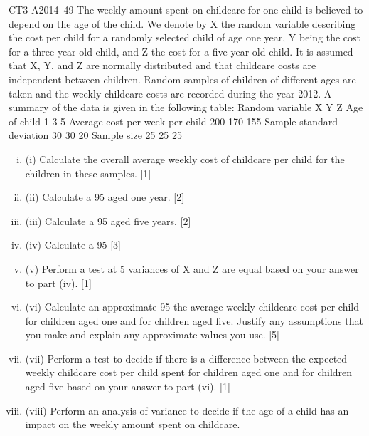 \documentclass[a4paper,12pt]{article}
\begin{document}
\begin{enumerate}
CT3 A2014–49
The weekly amount spent on childcare for one child is believed to depend on the age of the child. We denote by X the random variable describing the cost per child for a randomly selected child of age one year, Y being the cost for a three year old child, and Z the cost for a five year old child. It is assumed that X, Y, and Z are normally distributed and that childcare costs are independent between children. Random samples of children of different ages are taken and the weekly childcare costs are
recorded during the year 2012. A summary of the data is given in the following table:
Random variable
X
Y
Z
Age of child
1
3
5
Average cost per week per child 200 170 155
Sample standard deviation
30 30 20
Sample size
25 25 25

\begin{enumerate}[(i)]
\item (i)
Calculate the overall average weekly cost of childcare per child for the
children in these samples.
[1]
\item (ii) Calculate a 95%
aged one year.
[2]
\item (iii) Calculate a 95%
aged five years.
[2]
\item (iv) Calculate a 95%
[3]
\item (v) Perform a test at 5%
variances of X and Z are equal based on your answer to part (iv).
[1]
\item (vi) Calculate an approximate 95%
the average weekly childcare cost per child for children aged one and for
children aged five. Justify any assumptions that you make and explain any
approximate values you use.
[5]
\item (vii) Perform a test to decide if there is a difference between the expected weekly
childcare cost per child spent for children aged one and for children aged five
based on your answer to part (vi).
[1]
\item (viii) Perform an analysis of variance to decide if the age of a child has an impact on
the weekly amount spent on childcare.
\end{enumerate}


\end{enumerate}
\end{document}
